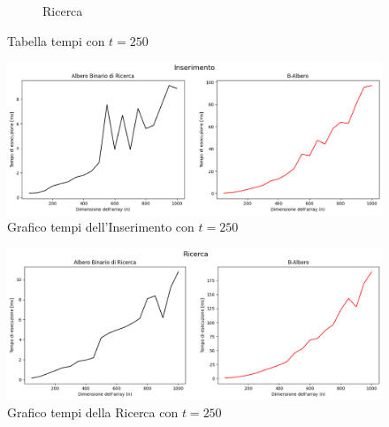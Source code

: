 \begin{figure}[H]
\begin{subfigure}[b]{0.49\textwidth}
        \caption{Ricerca}
        \label{fig:tablesearchtimet250}
    \end{subfigure}
    \caption{Tabella tempi con $t=250$}
    \label{fig:tabletimest250}
\end{figure}

\begin{figure}[H]
    \centering
    \includegraphics[width=\textwidth]{side-graphs/insert-ms-t250.png}
    \caption{Grafico tempi dell'Inserimento con $t=250$}
    \label{fig:sidegraphinserttimet250}
\end{figure}
    
\begin{figure}[H]
    \centering
    \includegraphics[width=\textwidth]{side-graphs/search-ms-t250.png}
    \caption{Grafico tempi della Ricerca con $t=250$}    
    \label{fig:sidegraphsearchtimet250}
\end{figure}

